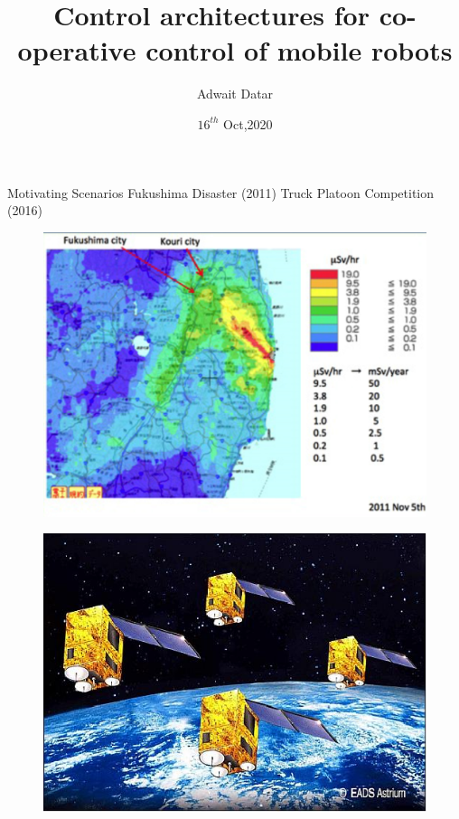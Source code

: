 \documentclass{beamer}
\title[Spectral Graph Theory Applications]{Control architectures for co-operative control of mobile robots}
\author{Adwait Datar}
\institute{PhD Workshop, 2020\\Technical University of Hamburg}
\date{$16^{th}$ Oct,2020}
\begin{document}
\begin{frame}	
  \titlepage
\end{frame}

\begin{frame}{Motivating Scenarios}
	Fukushima Disaster (2011)
	\hspace{0.4 cm}
	Truck Platoon Competition (2016)
	\\
	\begin{minipage}{0.45\textwidth}	
		\begin{figure}
			\includegraphics[width=1\textwidth]{figures/fukushima_disaster.jpg}
		\end{figure}
		\begin{figure}
			\includegraphics[scale=0.2]{figures/Essaim_constellation.jpg}\label{fig:satellite_flock}

\end{figure}
\end{minipage}
\end{frame}
\end{document}
